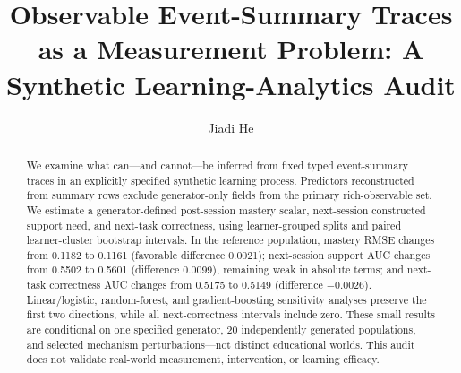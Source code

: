 \documentclass[11pt]{article}
\title{Observable Event-Summary Traces as a Measurement Problem: A Synthetic Learning-Analytics Audit}
\author{Jiadi He}
\begin{document}
\maketitle

\begin{abstract}
We examine what can—and cannot—be inferred from fixed typed event-summary traces in an explicitly specified synthetic learning process. Predictors reconstructed from summary rows exclude generator-only fields from the primary rich-observable set. We estimate a generator-defined post-session mastery scalar, next-session constructed support need, and next-task correctness, using learner-grouped splits and paired learner-cluster bootstrap intervals. In the reference population, mastery RMSE changes from 0.1182 to 0.1161 (favorable difference 0.0021); next-session support AUC changes from 0.5502 to 0.5601 (difference 0.0099), remaining weak in absolute terms; and next-task correctness AUC changes from 0.5175 to 0.5149 (difference −0.0026). Linear/logistic, random-forest, and gradient-boosting sensitivity analyses preserve the first two directions, while all next-correctness intervals include zero. These small results are conditional on one specified generator, 20 independently generated populations, and selected mechanism perturbations—not distinct educational worlds. This audit does not validate real-world measurement, intervention, or learning efficacy.
\end{abstract}

\begin{quote}
\noindent{}
\end{quote}
\end{document}

